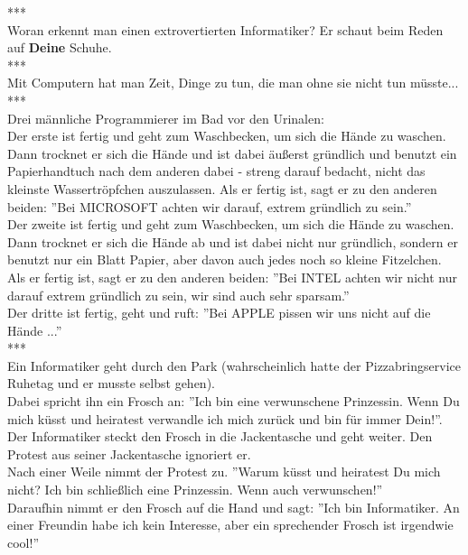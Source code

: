 ***\\


Woran erkennt man einen extrovertierten Informatiker? Er schaut beim Reden auf \textbf{Deine} Schuhe.\\


***\\


Mit Computern hat man Zeit, Dinge zu tun, die man ohne sie nicht tun müsste...\\


***\\


Drei männliche Programmierer im Bad vor den Urinalen: \\
\newline
Der erste ist fertig und geht zum Waschbecken, um sich die Hände zu waschen. Dann trocknet er sich die Hände und ist dabei äußerst gründlich und benutzt ein Papierhandtuch nach dem anderen dabei - streng darauf bedacht, nicht das kleinste Wassertröpfchen auszulassen. Als er fertig ist, sagt er zu den anderen beiden: ''Bei MICROSOFT achten wir darauf, extrem gründlich zu sein.'' \\
\newline
Der zweite ist fertig und geht zum Waschbecken, um sich die Hände zu waschen. Dann trocknet er sich die Hände ab und ist dabei nicht nur gründlich, sondern er benutzt nur ein Blatt Papier, aber davon auch jedes noch so kleine Fitzelchen. Als er fertig ist, sagt er zu den anderen beiden: ''Bei INTEL achten wir nicht nur darauf extrem gründlich zu sein, wir sind auch sehr sparsam.'' \\
\newline
Der dritte ist fertig, geht und ruft: ''Bei APPLE pissen wir uns nicht auf die Hände ...''\\


***\\


Ein Informatiker geht durch den Park (wahrscheinlich hatte der Pizzabringservice Ruhetag und er musste selbst gehen).\\
\newline
Dabei spricht ihn ein Frosch an: ''Ich bin eine verwunschene Prinzessin. Wenn Du mich küsst und heiratest verwandle ich mich zurück und bin für immer Dein!''.\\
\newline
Der Informatiker steckt den Frosch in die Jackentasche und geht weiter. Den Protest aus seiner Jackentasche ignoriert er.\\
\newline
Nach einer Weile nimmt der Protest zu. ''Warum küsst und heiratest Du mich nicht? Ich bin schließlich eine Prinzessin. Wenn auch verwunschen!''\\
\newline
Daraufhin nimmt er den Frosch auf die Hand und sagt: ''Ich bin Informatiker. An einer Freundin habe ich kein Interesse, aber ein sprechender Frosch ist irgendwie cool!''\\


